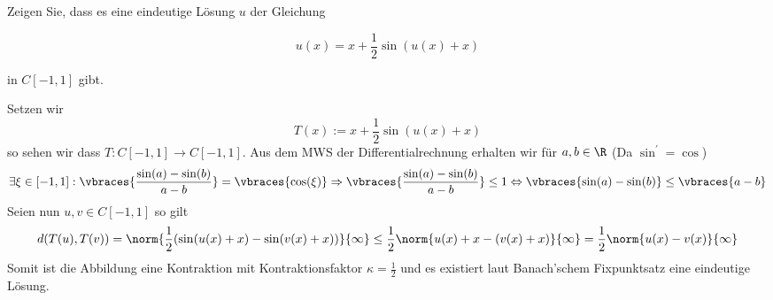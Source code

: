 \begin{exercise}

Zeigen Sie, dass es eine eindeutige Lösung $u$ der Gleichung

\begin{equation*}
  u(x) = x + \frac{1}{2}\sin(u(x)+x)
\end{equation*}

in $C[-1,1]$ gibt.

\end{exercise}

\begin{solution}

Setzen wir
\begin{equation*}
  T(x) :=  x + \frac{1}{2}\sin(u(x)+x)
\end{equation*}
so sehen wir dass $T: C[-1,1] \rightarrow C[-1,1]$.
Aus dem MWS der Differentialrechnung erhalten wir für $a,b \in \R$
(Da $\sin^\prime = \cos$)
\begin{align*}
  \exists \xi \in [-1,1]:
  \vbraces{\frac{\sin(a)-\sin(b)}{a-b}} = \vbraces{\cos(\xi)} \Rightarrow
  \vbraces{\frac{\sin(a)-\sin(b)}{a-b}} \leq 1 \Leftrightarrow
  \vbraces{\sin(a)-\sin(b)} \leq \vbraces{a-b}
\end{align*}
Seien nun $u,v \in C[-1,1]$ so gilt
\begin{align*}
  d(T(u),T(v)) = \norm{\frac{1}{2}(\sin(u(x)+x)-\sin(v(x)+x))}{\infty}
  \leq \frac{1}{2}\norm{u(x)+x-(v(x)+x)}{\infty}
  = \frac{1}{2}\norm{u(x)-v(x)}{\infty}
\end{align*}
Somit ist die Abbildung eine Kontraktion mit Kontraktionsfaktor
$\kappa = \frac{1}{2}$ und es existiert laut Banach'schem Fixpunktsatz eine
eindeutige Lösung.
\end{solution}
